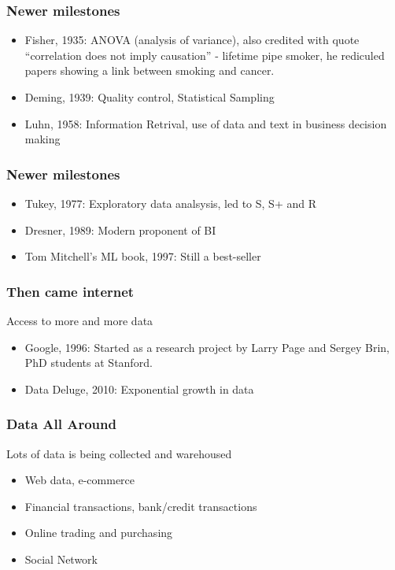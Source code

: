 \begin{frame}[fragile]\frametitle{Newer milestones}
\begin{itemize}
\item Fisher, 1935: ANOVA (analysis of variance), also credited with quote ``correlation does not imply causation'' - lifetime pipe smoker, he rediculed papers showing a link between smoking and cancer. 
\item Deming, 1939: Quality control, Statistical Sampling
\item Luhn, 1958: Information Retrival, use of data and text in business decision making
\end{itemize}
\end{frame}

\begin{frame}[fragile]\frametitle{Newer milestones}
\begin{itemize}
\item Tukey, 1977: Exploratory data analsysis, led to S, S+ and R
\item Dresner, 1989:  Modern proponent of BI
\item Tom Mitchell's ML book, 1997: Still a best-seller
\end{itemize}
\end{frame}

\begin{frame}[fragile]\frametitle{Then came internet}
Access to more and more data
\begin{itemize}
\item Google, 1996: Started as a research project by Larry Page and Sergey Brin, PhD students at Stanford.
\item Data Deluge, 2010: Exponential growth in data
\end{itemize}
\end{frame}

\begin{frame}[fragile]\frametitle{Data All Around}
Lots of data is being collected and warehoused 

\begin{itemize}
\item Web data, e-commerce
\item Financial transactions, bank/credit transactions
\item Online trading and purchasing
\item Social Network
\end{itemize}
\end{frame}

